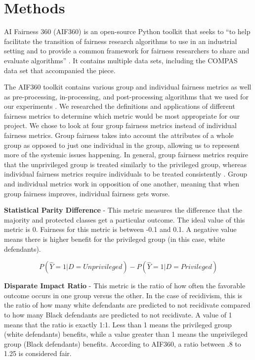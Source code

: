 \documentclass[water,article,submit,moreauthors,pdftex]{mdpi}
\begin{document}
\hypertarget{methods}{%
\section{Methods}\label{methods}}

AI Fairness 360 (AIF360) is an open-source Python toolkit that seeks to
``to help facilitate the transition of fairness research algorithms to
use in an industrial setting and to provide a common framework for
fairness researchers to share and evaluate algorithms''
\citep{aif360-oct-2018}. It contains multiple data sets, including the
COMPAS data set that accompanied the \citet{angwin2016machine} piece.

The AIF360 toolkit contains various group and individual fairness
metrics as well as pre-processing, in-processing, and post-processing
algorithms that we used for our experiments \citep{aif360-oct-2018}. We
researched the definitions and applications of different fairness
metrics \citep{ashokan2021fairness} to determine which metric would be
most appropriate for our project. We chose to look at four group
fairness metrics instead of individual fairness metrics. Group fairness
takes into account the attributes of a whole group as opposed to just
one individual in the group, allowing us to represent more of the
systemic issues happening. In general, group fairness metrics require
that the unprivileged group is treated similarly to the privileged
group, whereas individual fairness metrics require individuals to be
treated consistently \citep{kypraiou_what_2021}. Group and individual
metrics work in opposition of one another, meaning that when group
fairness improves, individual fairness gets worse.

\textbf{Statistical Parity Difference} - This metric measures the
difference that the majority and protected classes get a particular
outcome. The ideal value of this metric is 0. Fairness for this metric
is between -0.1 and 0.1. A negative value means there is higher benefit
for the privileged group (in this case, white defendants).

\[P(\hat{Y}=1|D=Unprivileged) - P(\hat{Y}=1|D=Privileged)\]

\textbf{Disparate Impact Ratio} - This metric is the ratio of how often
the favorable outcome occurs in one group versus the other. In the case
of recidivism, this is the ratio of how many white defendants are
predicted to not recidivate compared to how many Black defendants are
predicted to not recidivate. A value of 1 means that the ratio is
exactly 1:1. Less than 1 means the privileged group (white defendants)
benefits, while a value greater than 1 means the unprivileged group
(Black defendants) benefits. According to AIF360, a ratio between .8 to
1.25 is considered fair\citep{Ronaghan2019AI}.
\end{document}
